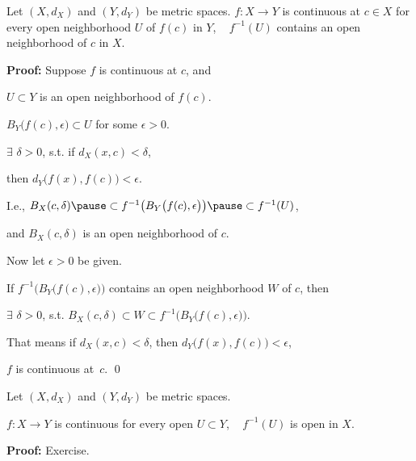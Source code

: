 \documentclass[10pt,aspectratio=169]{beamer}
\begin{document}
\begin{frame}
\begin{lemma}
Let $(X,d_X)$ and $(Y,d_Y)$ be metric spaces.
\pause
$f \colon X \to Y$ is continuous at $c \in X$
\wiffif for every open neighborhood $U$ of $f(c)$ in $Y$,  ~
$f^{-1}(U)$ contains an open neighborhood of $c$ in $X$.
\end{lemma}

\pause
\hfill{}

\vspace*{-1.05in}

\pause
\textbf{Proof:}
Suppose $f$ is continuous at $c$, and

\pause
$U \subset Y$ is an open neighborhood of $f(c)$.

\pause
\thus \quad
$B_Y\bigl(f(c),\epsilon\bigr) \subset U$ for some $\epsilon > 0$.

\pause
$\exists$ $\delta > 0$, s.t. if $d_X(x,c) < \delta$,

\pause
then
$d_Y\bigl(f(x),f(c)\bigr) < \epsilon$.

\pause
I.e.,
$
B_X(c,\delta)
\pause
\subset f^{-1}\bigl(B_Y\bigl(f(c),\epsilon\bigr)\bigr)
\pause
\subset
f^{-1}(U)$,

\pause
and $B_X(c,\delta)$ is an open neighborhood of $c$.

\pause
\medskip

Now let $\epsilon > 0$ be given.

\pause
If $f^{-1}\bigl(B_Y\bigl(f(c),\epsilon\bigr)\bigr)$ contains an open
neighborhood $W$ of $c$, then

\pause
$\exists$ $\delta > 0$, s.t.
$B_X(c,\delta) \subset W \subset
f^{-1}\bigl(B_Y\bigl(f(c),\epsilon\bigr)\bigr)$.

\pause
That means if $d_X(x,c) < \delta$,
then $d_Y\bigl(f(x),f(c)\bigr) < \epsilon$,

\pause
\thus \quad $f$ is continuous at~$c$.
\qed

\end{frame}

\begin{frame}

\begin{theorem}
Let $(X,d_X)$ and $(Y,d_Y)$ be metric spaces.

\pause
$f \colon X \to Y$
is continuous
\wiffif
for every open $U \subset Y$, ~ $f^{-1}(U)$ is open in $X$.
\end{theorem}

\pause
\textbf{Proof:} Exercise.

\end{frame}
\end{document}
